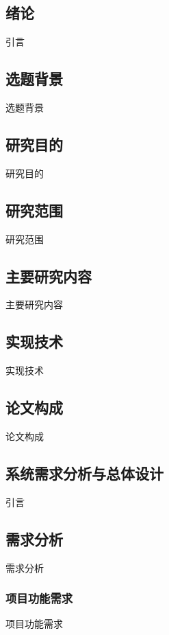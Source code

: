 \documentclass[twoside]{CUGThesis}
\begin{document}
\makeToc
	

\begin{spacing}{2}
	\section{绪论}
\end{spacing}
引言
	\subsection{选题背景}
	选题背景
	\subsection{研究目的}
	研究目的
	\subsection{研究范围}
	研究范围
	\subsection{主要研究内容}
	主要研究内容
	\subsection{实现技术}
	实现技术
	\subsection{论文构成}
	论文构成

\begin{spacing}{2}
	\section{系统需求分析与总体设计}
\end{spacing}
引言
	\subsection{需求分析}
	需求分析
		\subsubsection{项目功能需求}
		项目功能需求
\end{document}
